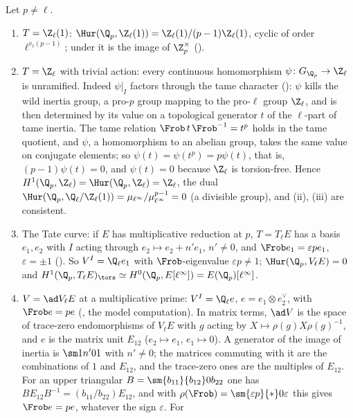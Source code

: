 \begin{example}\label{ex:galcoh:ur-examples}
Let $p\ne\ell$.
\begin{enumerate}[label=(\alph*)]
\item $T=\Z_\ell(1)$: $\Hur(\Q_p,\Z_\ell(1))=\Z_\ell(1)/(p-1)\Z_\ell(1)$, cyclic of order $\ell^{v_\ell(p-1)}$; under  it is the image of
$\Z_p^\times$ ().
\item $T=\Z_\ell$ with trivial action: every continuous homomorphism $\psi\colon G_{\Q_p}\to\Z_\ell$ is unramified. Indeed $\psi|_I$ factors through the tame character
(): $\psi$ kills the wild inertia group, a pro-$p$ group mapping to the pro-$\ell$ group $\Z_\ell$, and is then determined by its value on a topological
generator $t$ of the $\ell$-part of tame inertia. The tame relation $\Frob\,t\,\Frob^{-1}=t^p$ holds in the tame quotient, and $\psi$, a homomorphism to an abelian
group, takes the same value on conjugate elements; so $\psi(t)=\psi(t^p)=p\psi(t)$, that is, $(p-1)\psi(t)=0$, and $\psi(t)=0$ because $\Z_\ell$ is torsion-free. Hence $H^1(\Q_p,\Z_\ell)=\Hur(\Q_p,\Z_\ell)=\Z_\ell$, the dual
$\Hur(\Q_p,\Q_\ell/\Z_\ell(1))=\mu_{\ell^\infty}/\mu_{\ell^\infty}^{p-1}=0$ (a divisible group), and (ii), (iii) are consistent.
\item The Tate curve: if $E$ has multiplicative reduction at $p$, $T=T_\ell E$ has a basis $e_1,e_2$ with $I$ acting through $e_2\mapsto e_2+n'e_1$, $n'\ne0$, and
$\Frob e_1=\varepsilon pe_1$, $\varepsilon=\pm1$ (). So $V^I=\Q_\ell e_1$ with $\Frob$-eigenvalue $\varepsilon p\ne1$; $\Hur(\Q_p,V_\ell E)=0$ and
$H^1(\Q_p,T_\ell E)_{\tors}\simeq H^0(\Q_p,E[\ell^\infty])=E(\Q_p)[\ell^\infty]$.
\item $V=\ad V_\ell E$ at a multiplicative prime: $V^I=\Q_\ell e$, $e=e_1\otimes e_2^\vee$, with $\Frob e=pe$ (, the model computation). In matrix terms,
$\ad V$ is the space of trace-zero endomorphisms of $V_\ell E$ with $g$ acting by $X\mapsto\rho(g)X\rho(g)^{-1}$, and $e$ is the matrix unit $E_{12}$ ($e_2\mapsto e_1$,
$e_1\mapsto0$). A generator of the image of inertia is $\sm1{n'}01$ with $n'\ne0$; the matrices commuting with it are the combinations of $1$ and $E_{12}$, and the
trace-zero ones are the multiples of $E_{12}$. For an upper triangular $B=\sm{b_{11}}{b_{12}}0{b_{22}}$ one has $BE_{12}B^{-1}=(b_{11}/b_{22})E_{12}$, and with
$\rho(\Frob)=\sm{\varepsilon p}{*}0\varepsilon$ this gives $\Frob e=pe$, whatever the sign $\varepsilon$. For

\end{enumerate}
\end{example}
